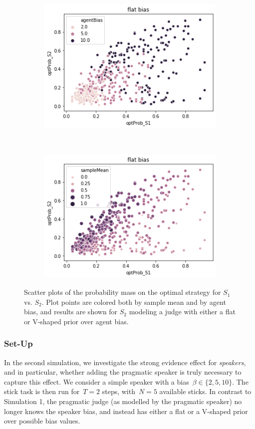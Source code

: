 \documentclass[10pt,letterpaper]{article}
\begin{document}
\begin{figure}[h]
\begin{subfigure}{0.45\textwidth}
	\includegraphics[width=\textwidth]{figures/seeFlatBias.png}
\end{subfigure}
~
\begin{subfigure}{0.45\textwidth}
	\includegraphics[width=\textwidth]{figures/seeFlatMean.png}
\end{subfigure}
\caption{Scatter plots of the probability mass on the optimal strategy for $S_1$ vs. $S_2$. Plot points are colored
both by sample mean and by agent bias, and results are shown for $S_2$ modeling a judge with either a flat or 
V-shaped prior over agent bias.} 
\label{fig:seeSpeaker}
\end{figure}

\subsubsection{Set-Up}
In the second simulation, we investigate the strong evidence effect for \textit{speakers}, and in particular, whether adding the 
pragmatic speaker is truly necessary to capture this effect. We consider a simple speaker with a bias~${\beta\in\{2, 5, 10\}}$.
The stick task is then run for~${T=2}$ steps, with~${N=5}$ available sticks. In contrast to Simulation 1, the pragmatic judge 
(as modelled by the pragmatic speaker) no longer knows the speaker bias, and instead has either a flat or a V-shaped prior over possible bias values.
\end{document}
